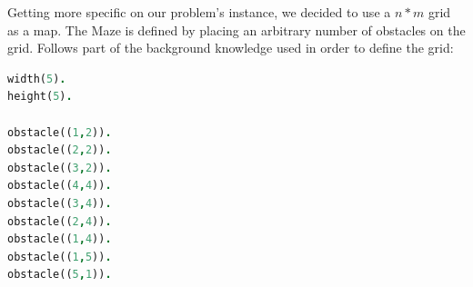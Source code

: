 Getting more specific on our problem's instance, we decided to use a \(n * m\) grid as a map. The Maze is defined by placing an arbitrary number
of obstacles on the grid. Follows part of the background knowledge used in order to define the grid:

\begin{lstlisting}[language=Prolog, caption=Grid definition]
%%% BACKGROUND KNOWLEDGE %%%
width(5).
height(5).

obstacle((1,2)).
obstacle((2,2)).
obstacle((3,2)).
obstacle((4,4)).
obstacle((3,4)).
obstacle((2,4)).
obstacle((1,4)).
obstacle((1,5)).
obstacle((5,1)).
\end{lstlisting}